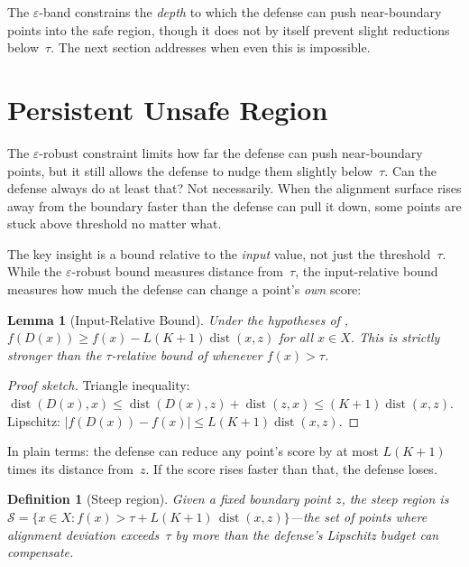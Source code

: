 \documentclass[11pt]{article}
\newtheorem{lemma}[theorem]{Lemma}
\newtheorem{definition}[theorem]{Definition}
\newcommand{\dist}{\operatorname{dist}}
\begin{document}
The $\varepsilon$-band constrains the \emph{depth} to which the defense
can push near-boundary points into the safe region, though it does not
by itself prevent slight reductions below~$\tau$. The next section
addresses when even this is impossible.


\section{Persistent Unsafe Region}
\label{sec:persistent}

The $\varepsilon$-robust constraint limits how far the defense can push
near-boundary points, but it still allows the defense to nudge them
slightly below~$\tau$. Can the defense always do at least that? Not
necessarily. When the alignment surface rises away from the boundary
faster than the defense can pull it down, some points are stuck above
threshold no matter what.

The key insight is a bound relative to the \emph{input} value, not just
the threshold~$\tau$. While the $\varepsilon$-robust bound measures
distance from~$\tau$, the input-relative bound measures how much the
defense can change a point's \emph{own} score:

\begin{lemma}[Input-Relative Bound]
\label{lem:input-bound}
Under the hypotheses of ,
$f(D(x)) \geq f(x) - L(K{+}1)\dist(x,z)$
for all $x \in X$. This is strictly stronger than the $\tau$-relative
bound of  whenever $f(x) > \tau$.
\end{lemma}

\begin{proof}[Proof sketch]
Triangle inequality:
$\dist(D(x), x) \leq \dist(D(x), z) + \dist(z, x)
\leq (K{+}1)\dist(x, z)$.
Lipschitz: $|f(D(x)) - f(x)| \leq L(K{+}1)\dist(x, z)$.
\end{proof}

In plain terms: the defense can reduce any point's score by at most
$L(K{+}1)$ times its distance from~$z$. If the score rises faster
than that, the defense loses.

\begin{definition}[Steep region]
\label{def:steep}
Given a fixed boundary point $z$, the \emph{steep region} is
$\mathcal{S} = \{x \in X : f(x) > \tau + L(K{+}1)\,\dist(x, z)\}$---the
set of points where alignment deviation exceeds~$\tau$ by more than
the defense's Lipschitz budget can compensate.
\end{definition}
\end{document}
